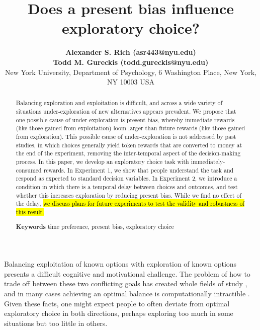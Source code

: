 \documentclass[10pt,letterpaper]{article}
\title{Does a present bias influence exploratory choice?}
\author{  {\large \bf Alexander S. Rich (asr443@nyu.edu)} \\ {\large\bf Todd M. Gureckis (todd.gureckis@nyu.edu)}\\
        New York University, Department of Psychology, 6 Washington Place, New York, NY 10003 USA}
\begin{document}
\maketitle

\begin{abstract}

  Balancing exploration and exploitation is difficult, and across a wide
  variety of situations under-exploration of new alternatives appears prevalent.
  We propose that one possible cause of
  under-exploration is present bias, whereby immediate rewards (like those
  gained from exploitation) loom larger than future rewards (like those
  gained from exploration). This possible cause of under-exploration is not
  addressed by past studies, in which choices generally yield token rewards
  that are converted to money at the end of the experiment, removing the
  inter-temporal aspect of the decision-making process. In this paper, we
  develop an exploratory choice task with immediately-consumed rewards. In
  Experiment 1, we show that people understand the task and respond as expected
  to standard decision variables. In Experiment 2, we introduce a condition in
  which there is a temporal delay between choices and outcomes, and test whether
  this increases exploration by reducing present bias. While we find no effect
  of the delay, \hl{we discuss plans for future experiments to test the validity and
  robustness of this result.}

  \textbf{Keywords} time preference, present bias, exploratory choice
\end{abstract}

Balancing exploitation of known options with exploration of known options
presents a difficult cognitive and motivational challenge. The problem of how to
trade off between these two conflicting goals has created whole fields of study
\citep{Mehlhorn2015, sutton1998reinforcement}, and in many cases achieving an
optimal balance is computationally intractible \citep{Guez2013}. Given these
facts, one might expect people to often deviate from optimal exploratory choice
in both directions, perhaps exploring too much in some situations but too little
in others.
\end{document}
